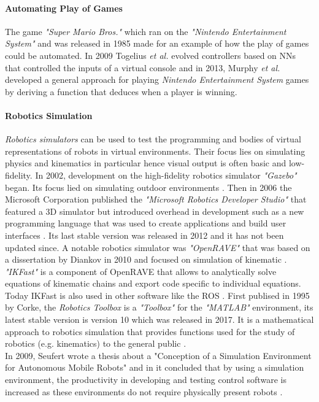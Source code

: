 \paragraph{Automating Play of Games}
The game \textit{"Super Mario Bros."} which ran on the \textit{"Nintendo Entertainment System"} and was released in 1985 made for an example of how the play of games could be automated. In 2009 Togelius \textit{et al.} evolved controllers based on \acp{NN} that controlled the inputs of a virtual console and in 2013, Murphy \textit{et al.} developed a general approach for playing \textit{Nintendo Entertainment System} games by deriving a function that deduces when a player is winning\cite{Tom13thefirst}\cite{5286481}. 

\paragraph{Robotics Simulation}
\emph{Robotics simulators} can be used to test the programming and bodies of virtual representations of robots in virtual environments. Their focus lies on simulating physics and kinematics in particular hence visual output is often basic and low-fidelity. In 2002, development on the high-fidelity robotics simulator \emph{"Gazebo"} began. Its focus lied on simulating outdoor environments \cite{Gazebo}\cite{Staranowicz2011}. Then in 2006 the Microsoft Corporation published the \emph{"Microsoft Robotics Developer Studio"} that featured a 3D simulator but introduced overhead in development such as a new programming language that was used to create applications and build user interfaces \cite{MRDS}. Its last stable version was released in 2012 and it has not been updated since. A notable robotics simulator was \emph{"OpenRAVE"} that was based on a dissertation by Diankov in 2010 and focused on simulation of kinematic \cite{diankov_thesis}\cite{openRAVE}. \emph{"IKFast"} is a component of OpenRAVE that allows to analytically solve equations of kinematic chains and export code specific to individual equations. Today IKFast is also used in other software like the \ac{ROS} \cite{moveitikfast}.
First publised in 1995 by Corke, the \emph{Robotics Toolbox} is a \emph{"Toolbox"} for the \emph{"MATLAB"} environment, its latest stable version is version 10 which was released in 2017. It is a mathematical approach to robotics simulation that provides functions used for the study of robotics (e.g. kinematics) to the general public \cite{CorkePaper1995}\cite{CorkePaper1996}\cite{CorkematlabRoboticsToolboxBlog}.\\
In 2009, Seufert wrote a thesis about a "Conception of a Simulation Environment for Autonomous Mobile Robots" and in it concluded that by using a simulation environment, the productivity in developing and testing control software is increased as these environments do not require physically present robots \cite{Seufert2009}.